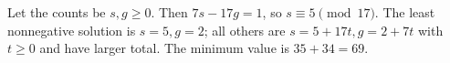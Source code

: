 Let the counts be $s,g\ge0$. Then $7s-17g=1$, so $s\equiv5\pmod{17}$. The least nonnegative solution is $s=5,g=2$; all others are $s=5+17t,g=2+7t$ with $t\ge0$ and have larger total. The minimum value is $35+34=\boxed{69}$.
